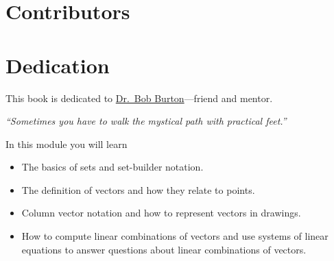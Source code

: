 \documentclass{workbook}
\begin{document}







\hypersetup{bookmarksdepth=3}

\pagestyle{empty}



\newpage

\begin{bookonly}
	\clearpage
	\hbox{}
	\newpage
	
	\section*{Contributors}
	
	\section*{Dedication}
	\begin{center}
		This book is dedicated to
		\href{https://www.gazettetimes.com/news/local/obituaries/dr-robert-main-burton/article_9c087f07-c005-515a-bb3f-2c9c6a6b7332.html}{\color{blue}Dr.~Bob Burton}---friend and mentor.

		\emph{\large ``Sometimes you have to walk the mystical path with practical feet.''}
	\end{center}
	\newpage
	\mbox{}
	{
		\pagestyle{empty}
		\setcounter{tocdepth}{1}
		\tableofcontents
		\thispagestyle{empty}
	}
	\newpage
	\mbox{}
	\newpage
\end{bookonly}

\setcounter{page}{1}
\pagestyle{siefken}



\begin{module}\label{module1}

	In this module you will learn
	\begin{itemize}
		\item The basics of sets and set-builder notation.
		\item The definition of vectors and how they relate to points.
		\item Column vector notation and how to represent vectors in drawings.
		\item How to compute linear combinations of vectors and use systems of linear
			equations to answer questions about linear combinations of vectors.
	\end{itemize}

	
	
\end{module}
\end{document}
